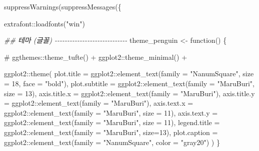 \documentclass[
  letterpaper,
]{book}
\newenvironment{Shaded}{\begin{snugshade}}{\end{snugshade}}
\newcommand{\AttributeTok}[1]{\textcolor[rgb]{0.40,0.45,0.13}{#1}}
\newcommand{\CommentTok}[1]{\textcolor[rgb]{0.37,0.37,0.37}{#1}}
\newcommand{\ControlFlowTok}[1]{\textcolor[rgb]{0.00,0.23,0.31}{#1}}
\newcommand{\DecValTok}[1]{\textcolor[rgb]{0.68,0.00,0.00}{#1}}
\newcommand{\DocumentationTok}[1]{\textcolor[rgb]{0.37,0.37,0.37}{\textit{#1}}}
\newcommand{\FunctionTok}[1]{\textcolor[rgb]{0.28,0.35,0.67}{#1}}
\newcommand{\NormalTok}[1]{\textcolor[rgb]{0.00,0.23,0.31}{#1}}
\newcommand{\OtherTok}[1]{\textcolor[rgb]{0.00,0.23,0.31}{#1}}
\newcommand{\SpecialCharTok}[1]{\textcolor[rgb]{0.37,0.37,0.37}{#1}}
\newcommand{\StringTok}[1]{\textcolor[rgb]{0.13,0.47,0.30}{#1}}
\begin{document}
\begin{Shaded}
\begin{Highlighting}[]
\FunctionTok{suppressWarnings}\NormalTok{(}\FunctionTok{suppressMessages}\NormalTok{(\{}

\NormalTok{  extrafont}\SpecialCharTok{::}\FunctionTok{loadfonts}\NormalTok{(}\StringTok{"win"}\NormalTok{)}


  \DocumentationTok{\#\# 테마 (글꼴) {-}{-}{-}{-}{-}{-}{-}{-}{-}{-}{-}{-}{-}{-}{-}{-}{-}{-}{-}{-}{-}{-}{-}{-}{-}{-}{-}{-}{-}}
\NormalTok{  theme\_penguin }\OtherTok{\textless{}{-}} \ControlFlowTok{function}\NormalTok{() \{}

    \CommentTok{\# ggthemes::theme\_tufte() +}
\NormalTok{    ggplot2}\SpecialCharTok{::}\FunctionTok{theme\_minimal}\NormalTok{() }\SpecialCharTok{+}

\NormalTok{      ggplot2}\SpecialCharTok{::}\FunctionTok{theme}\NormalTok{(}
        \AttributeTok{plot.title     =}\NormalTok{ ggplot2}\SpecialCharTok{::}\FunctionTok{element\_text}\NormalTok{(}\AttributeTok{family =} \StringTok{"NanumSquare"}\NormalTok{, }\AttributeTok{size =} \DecValTok{18}\NormalTok{, }\AttributeTok{face =} \StringTok{"bold"}\NormalTok{),}
        \AttributeTok{plot.subtitle  =}\NormalTok{ ggplot2}\SpecialCharTok{::}\FunctionTok{element\_text}\NormalTok{(}\AttributeTok{family =} \StringTok{"MaruBuri"}\NormalTok{, }\AttributeTok{size =} \DecValTok{13}\NormalTok{),}
        \AttributeTok{axis.title.x   =}\NormalTok{ ggplot2}\SpecialCharTok{::}\FunctionTok{element\_text}\NormalTok{(}\AttributeTok{family =} \StringTok{"MaruBuri"}\NormalTok{),}
        \AttributeTok{axis.title.y   =}\NormalTok{ ggplot2}\SpecialCharTok{::}\FunctionTok{element\_text}\NormalTok{(}\AttributeTok{family =} \StringTok{"MaruBuri"}\NormalTok{),}
        \AttributeTok{axis.text.x    =}\NormalTok{ ggplot2}\SpecialCharTok{::}\FunctionTok{element\_text}\NormalTok{(}\AttributeTok{family =} \StringTok{"MaruBuri"}\NormalTok{, }\AttributeTok{size =} \DecValTok{11}\NormalTok{),}
        \AttributeTok{axis.text.y    =}\NormalTok{ ggplot2}\SpecialCharTok{::}\FunctionTok{element\_text}\NormalTok{(}\AttributeTok{family =} \StringTok{"MaruBuri"}\NormalTok{, }\AttributeTok{size =} \DecValTok{11}\NormalTok{),}
        \AttributeTok{legend.title   =}\NormalTok{ ggplot2}\SpecialCharTok{::}\FunctionTok{element\_text}\NormalTok{(}\AttributeTok{family =} \StringTok{"MaruBuri"}\NormalTok{, }\AttributeTok{size=}\DecValTok{13}\NormalTok{),}
        \AttributeTok{plot.caption   =}\NormalTok{ ggplot2}\SpecialCharTok{::}\FunctionTok{element\_text}\NormalTok{(}\AttributeTok{family =} \StringTok{"NanumSquare"}\NormalTok{, }\AttributeTok{color =} \StringTok{"gray20"}\NormalTok{)}
\NormalTok{      )}
\NormalTok{  \}}


\end{Highlighting}
\end{Shaded}
\end{document}
